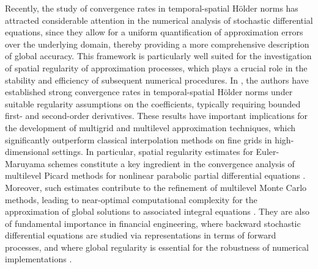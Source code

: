 \documentclass[11pt]{article}
\theoremstyle{theorem}
\theoremstyle{definition}
\newcommand{\1}{{\bf 1}}
\begin{document}
Recently, the study of convergence rates in temporal-spatial H\"older norms has attracted considerable attention in the numerical analysis of stochastic differential equations,
since they allow for a uniform quantification of approximation errors over the underlying domain, thereby providing a more comprehensive description of global accuracy. This framework is particularly well suited for the investigation of spatial regularity of approximation processes, which plays a crucial role in the stability and efficiency of subsequent numerical procedures. In \cite{HN22}, the authors  have established strong convergence rates in temporal-spatial H\"older norms under suitable regularity assumptions on the coefficients, typically requiring bounded first- and second-order derivatives. These results have important implications for the development of multigrid and multilevel approximation techniques, which significantly outperform classical interpolation methods on fine grids in high-dimensional settings. In particular, spatial regularity estimates for Euler-Maruyama schemes constitute a key ingredient in the convergence analysis of multilevel Picard methods for nonlinear parabolic partial differential equations \cite{NNW25}. Moreover, such estimates contribute to the refinement of multilevel Monte Carlo methods, leading to near-optimal computational complexity for the approximation of global solutions to associated integral equations \cite{Giles2008}. They are also of fundamental importance in financial engineering, where backward stochastic differential equations are studied via representations in terms of forward processes, and where global regularity is essential for the robustness of numerical implementations \cite{HJKN23}.
\end{document}
